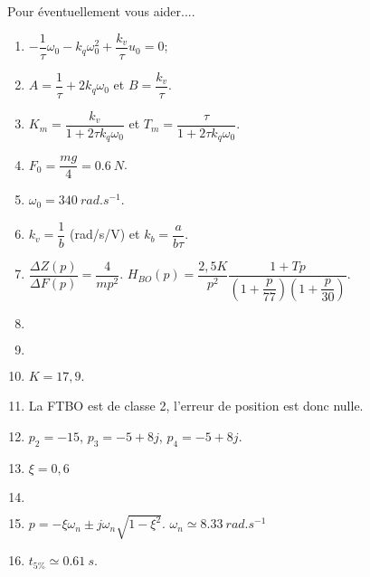\begin{multicols}{2}


Pour éventuellement vous aider....
\begin{enumerate}
\item $-\dfrac{1}{\tau}\omega_0 - k_q \omega_0^2 + \dfrac{k_v}{\tau}u_0=0$;
\item $A=\dfrac{1}{\tau}+2k_q\omega_0$ et $B=\dfrac{k_v}{\tau}$.
\item $K_m=\dfrac{k_v}{1+2\tau k_q \omega_0}$ et $T_m=\dfrac{\tau}{1+2\tau k_q \omega_0}$.
\item $F_0=\dfrac{mg}{4}=\SI{0,6}{N}$.
\item $\omega_0=\SI{340}{rad.s^{-1}}$.
\item $k_v=\dfrac{1}{b}$ (rad/s/V) et $k_b=\dfrac{a}{b\tau}$.
\item $\dfrac{\Delta Z(p)}{\Delta F(p)}=\dfrac{4}{mp^2}$. $H_{BO}(p)=\dfrac{2,5 K}{p^2}\dfrac{1+Tp}{\left( 1+\dfrac{p}{77}\right)\left(1+\dfrac{p}{30} \right)}$.
\item  $\quad$
\item $\quad$
\item $K=17,9$.
\item La FTBO est de classe 2, l'erreur de position est donc nulle.
\item $p_2=-15$, $p_3 = -5+8j$, $p_4=-5+8j$.
\item $\xi=0,6$
\item $\quad$
\item $p=-\xi\omega_n \pm j\omega_n \sqrt{1-\xi^2}$. $\omega_n\simeq \SI{8,33}{rad.s^{-1}}$
\item $t_{5\%}\simeq \SI{0,61}{ s}$. 
\end{enumerate}
\end{multicols}

%
%
%
%
%
%
